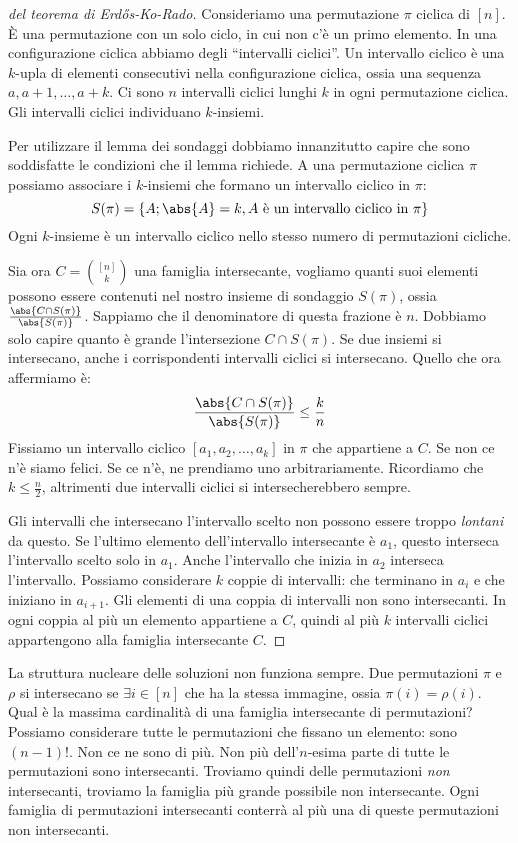 \begin{proof}[del teorema di Erd\H{o}s-Ko-Rado]
	Consideriamo una permutazione $\pi$ ciclica di $[n]$.
	\`E una permutazione con un solo ciclo, in cui non c'\`e un primo elemento.
	In una configurazione ciclica abbiamo degli ``intervalli ciclici''.
	Un intervallo ciclico \`e una $k$-upla di elementi consecutivi nella configurazione ciclica, ossia una sequenza $a, a+1, \dots, a+k$.
	Ci sono $n$ intervalli ciclici lunghi $k$ in ogni permutazione ciclica.
	Gli intervalli ciclici individuano $k$-insiemi.

	Per utilizzare il lemma dei sondaggi dobbiamo innanzitutto capire che sono soddisfatte le condizioni che il lemma richiede.
	A una permutazione ciclica $\pi$ possiamo associare i $k$-insiemi che formano un intervallo ciclico in $\pi$:
	\[
		S(\pi) = \{ A; \abs{A} = k, A \text{ \`e un intervallo ciclico in } \pi \}
	\]
	Ogni $k$-insieme \`e un intervallo ciclico nello stesso numero di permutazioni cicliche.

	Sia ora $C = \binom{[n]}{k}$ una famiglia intersecante, vogliamo quanti suoi elementi possono essere contenuti nel nostro insieme di sondaggio $S(\pi)$, ossia $\frac{\abs{C \cap S(\pi)}}{\abs{S(\pi)}}$.
	Sappiamo che il denominatore di questa frazione \`e $n$.
	Dobbiamo solo capire quanto \`e grande l'intersezione $C \cap S(\pi)$.
	Se due insiemi si intersecano, anche i corrispondenti intervalli ciclici si intersecano.
	Quello che ora affermiamo \`e:
	\[
		\frac{\abs{C \cap S(\pi)}}{\abs{S(\pi)}} \le \frac{k}{n}
	\]
	Fissiamo un intervallo ciclico $[a_1, a_2, \dots, a_k]$ in $\pi$ che appartiene a $C$.
	Se non ce n'\`e siamo felici.
	Se ce n'\`e, ne prendiamo uno arbitrariamente.
	Ricordiamo che $k \le \frac{n}{2}$, altrimenti due intervalli ciclici si intersecherebbero sempre.

	Gli intervalli che intersecano l'intervallo scelto non possono essere troppo \emph{lontani} da questo.
	Se l'ultimo elemento dell'intervallo intersecante \`e $a_1$, questo interseca l'intervallo scelto solo in $a_1$.
	Anche l'intervallo che inizia in $a_2$ interseca l'intervallo.
	Possiamo considerare $k$ coppie di intervalli: che terminano in $a_i$ e che iniziano in $a_{i+1}$.
	Gli elementi di una coppia di intervalli non sono intersecanti.
	In ogni coppia al pi\`u un elemento appartiene a $C$, quindi al pi\`u $k$ intervalli ciclici appartengono alla famiglia intersecante $C$.
\end{proof}

La struttura nucleare delle soluzioni non funziona sempre.
Due permutazioni $\pi$ e $\rho$ si intersecano se $\exists i \in [n]$ che ha la stessa immagine, ossia $\pi(i) = \rho(i)$.
Qual \`e la massima cardinalit\`a di una famiglia intersecante di permutazioni?
Possiamo considerare tutte le permutazioni che fissano un elemento: sono $(n-1)!$.
Non ce ne sono di pi\`u.
Non pi\`u dell'$n$-esima parte di tutte le permutazioni sono intersecanti.
Troviamo quindi delle permutazioni \emph{non} intersecanti, troviamo la famiglia pi\`u grande possibile non intersecante.
Ogni famiglia di permutazioni intersecanti conterr\`a al pi\`u una di queste permutazioni non intersecanti.


